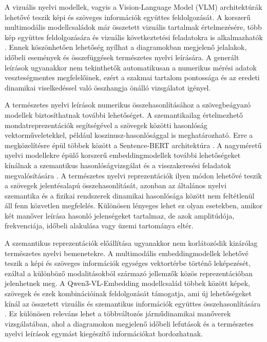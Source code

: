 \documentclass[12pt,a4paper,onehalfspacing, oneside]{book} %
\begin{document}
A vizuális nyelvi modellek, vagyis a Vision-Language Model (VLM) architektúrák lehetővé teszik képi és szöveges információk együttes feldolgozását. A korszerű multimodális modellcsaládok már összetett vizuális tartalmak értelmezésére, több kép együttes feldolgozására és vizuális következtetési feladatokra is alkalmazhatók \cite{bai2025qwen3}. Ennek köszönhetően lehetőség nyílhat a diagramokban megjelenő jelalakok, időbeli események és összefüggések természetes nyelvi leírására. A generált leírások ugyanakkor nem tekinthetők automatikusan a numerikus mérési adatok veszteségmentes megfelelőinek, ezért a szakmai tartalom pontossága és az eredeti dinamikai viselkedéssel való összhangja önálló vizsgálatot igényel.

A természetes nyelvi leírások numerikus összehasonlításához a szövegbeágyazó modellek biztosíthatnak további lehetőséget. A szemantikailag értelmezhető mondatreprezentációk segítségével a szövegek közötti hasonlóság vektorműveletekkel, például koszinusz-hasonlósággal is meghatározható. Erre a megközelítésre épül többek között a Sentence-BERT architektúra \cite{reimers2019sentence}. A nagyméretű nyelvi modellekre épülő korszerű embeddingmodellek további lehetőségeket kínálnak a szemantikus hasonlóságvizsgálat és a visszakeresési feladatok megvalósítására \cite{zhang2025qwen3}. A természetes nyelvi reprezentációk ilyen módon lehetővé teszik a szövegek jelentésalapú összehasonlítását, azonban az általános nyelvi szemantika és a fizikai rendszerek dinamikai hasonlósága között nem feltétlenül áll fenn közvetlen megfelelés. Különösen lényeges lehet ez olyan esetekben, amikor két manőver leírása hasonló jelenségeket tartalmaz, de azok amplitúdója, frekvenciája, időbeli alakulása vagy üzemi tartománya eltér.

A szemantikus reprezentációk előállítása ugyanakkor nem korlátozódik kizárólag természetes nyelvi bemenetekre. A multimodális embeddingmodellek lehetővé teszik a képi és szöveges információk egységes vektortérbe történő leképezését, ezáltal a különböző modalitásokból származó jellemzők közös reprezentációban jelenhetnek meg. A Qwen3-VL-Embedding modellcsalád többek között képek, szövegek és ezek kombinációinak feldolgozását támogatja, ami új lehetőségeket kínál az összetett vizuális és szemantikus információk együttes összehasonlítására \cite{li2026qwen3}. Ez különösen releváns lehet a többváltozós járműdinamikai manőverek vizsgálatában, ahol a diagramokon megjelenő időbeli lefutások és a természetes nyelvi leírások egymást kiegészítő információkat hordozhatnak.
\end{document}
